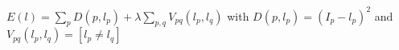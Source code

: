 \documentclass[class=minimal,border=2pt]{standalone}
\begin{document}
$E(l) = \sum\limits_{p} D(p,l_{p})  + \lambda\sum\limits_{p,q} V_{pq}(l_{p},l_{q})$
with
$D(p,l_{p}) = (I_p-l_p)^2$
and $V_{pq}(l_{p},l_{q}) = [l_p \ne l_q]$
\end{document}
